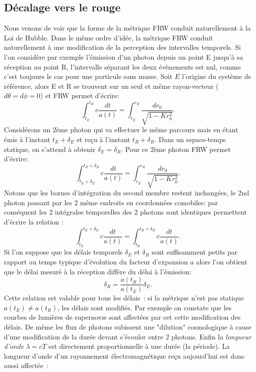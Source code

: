 \subsection{Décalage vers le rouge}
Nous venons de voir que la forme de la métrique FRW conduit naturellement à la Loi de Hubble. Dans le même ordre d'idée, la métrique FRW conduit naturellement à une modification de la perception des intervalles temporels. Si l'on considère par exemple l'émission d'un photon depuis un point E jusqu'à sa réception au point R, l'intervalle séparant les deux évènements est nul, comme c'est toujours le cas pour une particule sans masse. Soit $E$ l'origine du système de référence, alors E et R se trouvent sur un seul et même rayon-vecteur ($d\theta=d\phi=0$) et FRW permet d'écrire:
\begin{equation}
\int_{t_E}^{t_R}c\frac{dt}{a(t)}=\int_{r_E}^{r_R}\frac{ dr_0}{\sqrt{1-Kr_0^2}}.
\end{equation}
Considérons un 2ème photon qui va effectuer le même parcours mais en étant émis à l'instant $t_E+\delta_E$ et reçu à l'instant $t_R+\delta_R$. Dans un espace-temps statique, on s'attend à obtenir $\delta_E=\delta_R$. Pour ce 2ème photon FRW permet d'écrire:
\begin{equation}
\int_{t_E+\delta_E}^{t_R+\delta_R}c\frac{dt}{a(t)}=\int_{r_E}^{r_R}\frac{ dr_0}{\sqrt{1-Kr_0^2}}.
\end{equation}
Notons que les bornes d'intégration du second membre restent inchangées, le 2nd photon passant par les 2 même endroits en coordonnées comobiles: par conséquent les 2 intégrales temporelles des 2 photons sont identiques permettent d'écrire la relation :
\begin{equation}
\int_{t_E}^{t_E+\delta_E}c\frac{dt}{a(t)}=\int_{t_R}^{t_R+\delta_R}c\frac{dt}{a(t)}.
\end{equation}
Si l'on suppose que les délais temporels $\delta_E$ et $\delta_R$ sont suffisamment petits par rapport au temps typique d'évolution du facteur d'expansion $a$ alors l'on obtient que le délai mesuré à la réception diffère du délai à l'émission:
\begin{equation}
\delta_R=\frac{a(t_R)}{a(t_E)} \delta_E.
\end{equation}
Cette relation est valable pour tous les délais~: si la métrique n'est pas statique $a(t_E)\neq a(t_R)$, les délais sont modifiés. Par exemple on constate que les courbes de lumières de supernovæ sont affectées par cet cette modification des délais. De même les flux de photons subissent une "dilution" cosmologique à cause d'une modification de la durée devant s'écouler entre 2 photons. Enfin la \textit{longueur d'onde} $\lambda=cT$ est directement proportionnelle à une durée (la période). La longueur d'onde d'un rayonnement électromagnétique reçu aujourd'hui est donc aussi affectée~:
